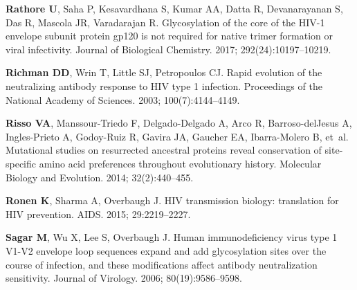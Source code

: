 \documentclass[9pt]{elife}
\begin{document}
\begin{thebibliography}{114}
\textbf{\color{eLifeMediumGrey} Rathore U}, Saha P, Kesavardhana S, Kumar AA,
  Datta R, Devanarayanan S, Das R, Mascola JR, Varadarajan R.
\newblock Glycosylation of the core of the HIV-1 envelope subunit protein gp120
  is not required for native trimer formation or viral infectivity.
\newblock Journal of Biological Chemistry.  2017; 292(24):10197--10219.

\textbf{\color{eLifeMediumGrey} Richman DD}, Wrin T, Little SJ, Petropoulos CJ.
\newblock Rapid evolution of the neutralizing antibody response to HIV type 1
  infection.
\newblock Proceedings of the National Academy of Sciences.  2003;
  100(7):4144--4149.

\textbf{\color{eLifeMediumGrey} Risso VA}, Manssour-Triedo F, Delgado-Delgado
  A, Arco R, Barroso-delJesus A, Ingles-Prieto A, Godoy-Ruiz R, Gavira JA,
  Gaucher EA, Ibarra-Molero B, et~al.
\newblock Mutational studies on resurrected ancestral proteins reveal
  conservation of site-specific amino acid preferences throughout evolutionary
  history.
\newblock Molecular Biology and Evolution.  2014; 32(2):440--455.

\textbf{\color{eLifeMediumGrey} Ronen K}, Sharma A, Overbaugh J.
\newblock HIV transmission biology: translation for HIV prevention.
\newblock AIDS.  2015; 29:2219--2227.

\textbf{\color{eLifeMediumGrey} Sagar M}, Wu X, Lee S, Overbaugh J.
\newblock Human immunodeficiency virus type 1 {V1-V2} envelope loop sequences
  expand and add glycosylation sites over the course of infection, and these
  modifications affect antibody neutralization sensitivity.
\newblock Journal of Virology.  2006; 80(19):9586--9598.


\end{thebibliography}
\end{document}
